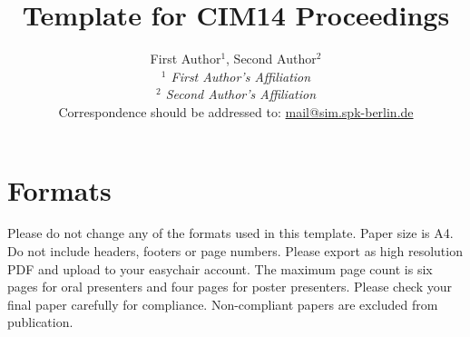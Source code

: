 \documentclass[a4paper, twocolumn]{article}
\begin{document}
\fontsize{9}{9.5}\selectfont
 

\date{}                     

\title{\vspace{-8mm}\textbf{\sc%
\fontsize{16}{16}\selectfont
%
Template for CIM14 Proceedings
%
\mbox{}\vspace{-1mm}
%
}}


\author{ %
%
First Author$^1$, Second Author$^2$\\
%
 \textit{\normalsize %
$^1$ First Author's Affiliation
}\\
%
%
\emph{\normalsize %
$^2$ Second Author's Affiliation
}\\
%
\footnotesize 
Correspondence should be addressed to: %
%
%
\href{mailto:mail@sim.spk-berlin.de}{mail@sim.spk-berlin.de}
}
%
\maketitle
%
 



\section{Formats} \label{sec:Formats}

Please do not change any of the formats used in this template.
%
%
Paper size is A4.
%
Do not include headers, footers or page numbers.
%
Please export as high resolution PDF and upload to your easychair account.
%
The maximum page count is six pages for oral presenters and four pages for
poster presenters.
%
Please check your final paper carefully for compliance. Non-compliant
papers are excluded from publication.
\end{document}

